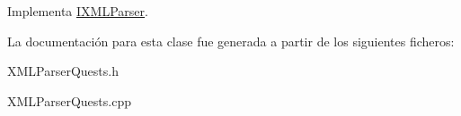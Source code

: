 Implementa \hyperlink{classIXMLParser_a2d6e54d4628bdf52a45ac1e18902b3d3}{I\+X\+M\+L\+Parser}.



La documentación para esta clase fue generada a partir de los siguientes ficheros\+:\begin{DoxyCompactItemize}
\item 
X\+M\+L\+Parser\+Quests.\+h\item 
X\+M\+L\+Parser\+Quests.\+cpp\end{DoxyCompactItemize}
